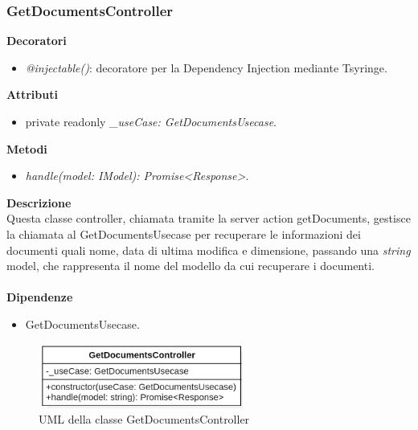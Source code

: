 \subsubsection{GetDocumentsController}
\textbf{Decoratori}
\begin{itemize}
    \item \textit{@injectable()}: decoratore per la Dependency Injection mediante Tsyringe.
\end{itemize}
\textbf{Attributi}
\begin{itemize}
    \item private readonly \textit{\_useCase: GetDocumentsUsecase}.
\end{itemize}
\textbf{Metodi}
\begin{itemize}
    \item \textit{handle(model: IModel): Promise<Response>}.
\end{itemize}
\textbf{Descrizione}\\
Questa classe controller, chiamata tramite la server action getDocuments, gestisce la chiamata al GetDocumentsUsecase per recuperare le informazioni dei documenti quali nome, data di ultima modifica e dimensione, passando una \textit{string} model, che rappresenta il nome del modello da cui recuperare i documenti.\\ \\
\textbf{Dipendenze}
\begin{itemize}
    \item GetDocumentsUsecase.
\end{itemize}

\begin{figure}[h!]
    \centering  
    \includegraphics[width=0.6\textwidth]{GetDocumentsController.png}
    \caption{UML della classe GetDocumentsController}
\end{figure}

